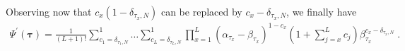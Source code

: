 \documentclass[10pt]{article}
\numberwithin{equation}{section}
\numberwithin{equation}{subsection}
\newcommand{\dt}{\;.}
\begin{document}
\begin{comment}
The product $\left(\mathcal{S}_{2}^{-1}\right)^{\otimes L}|\Psi^{''}\rangle$ gives a vector $|\Psi^{'}\rangle$ whose component are denoted by $\Psi^{'}(\bm{\tau})$. 
To find these quantities we fix the rows correspondent to $\bm{\tau}$ in the matrix $\left(\mathcal{S}_{2}^{-1}\right)^{\otimes L}$. Consider a string $\bm{\tau}=(\tau_{1},\ldots,\tau_{L})$ with $\tau_{1},\ldots,\tau_{L}\in \{1,\ldots,N\}$, then the corresponding row reads
\begin{equation}
	\begin{split}
\left(\mathcal{S}_{2}^{-1}\right)^{\otimes L}_{\bm{\tau}}&=\,e_{\tau_{1},\ldots,\tau_{L}}^{\tau_{1},\ldots,\tau_{L}}+\sum_{q_{1}=1}^{L}(1-\delta_{\tau_{q_{1}},N})e_{\tau_{1},\ldots,\tau_{L}}^{\varphi_{1}^{1},\ldots,\varphi_{L}^{1}}\beta_{\tau_{q_{1}}}\\&+\sum_{q_{1},q_{2}=1\,:\,q_{1}\neq q_{2}}^{L}(1-\delta_{\tau_{q_{1}},N})(1-\delta_{\tau_{q_{2}},N})e_{\tau_{1},\ldots,\tau_{L}}^{\varphi_{1}^{2},\ldots,\varphi_{L}^{2}}\beta_{\tau_{q_{1}}}\beta_{\tau_{q_{2}}}
  \\&+
  \ldots+\sum_{q_{1},\ldots,q_{L}=1\,:\,q_{i}\neq q_{j}\;\text{if}\;i\neq j}^{L}\left(\prod_{x=1}^{L}(1-\delta_{\tau_{x},N})\right)\left(\beta_{\tau_{x}}\right)^{1-\delta_{\tau_{x},1}}e_{\tau_{1},\ldots,\tau_{L}}^{\varphi_{1}^{L},\ldots,\varphi_{L}^{L}}
	\end{split}
\end{equation}
\end{comment}
Observing now that $c_{x}(1-\delta_{\tau_{x},N})$ can be replaced by  $c_{x}-\delta_{\tau_{x},N}$, we finally have
\begin{equation}\label{elementsABS}
	\begin{split}
		\Psi^{'}(\bm{\tau})=\frac{1}{(L+1)!}\sum_{c_{1}=\delta_{\tau_{1},N}}^{1}\ldots\sum_{c_{L}=\delta_{\tau_{L},N}}^{1}\prod_{x=1}^{L}(\alpha_{\tau_{x}}-\beta_{\tau_{x}})^{1-c_{x}}\left(1+\sum_{j=x}^{L}c_{j}\right)\beta_{\tau_{x}}^{c_{x}-\delta_{\tau_{x},N}}\dt
	\end{split}
\end{equation} 
\end{document}
